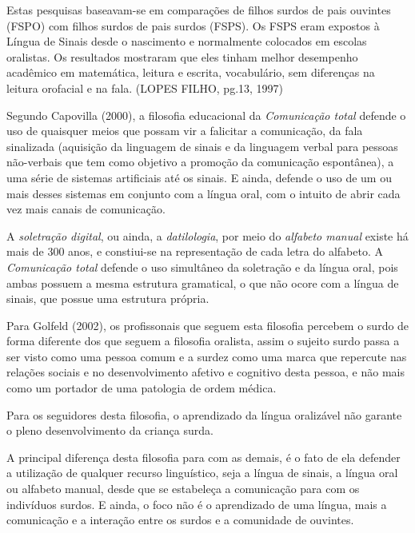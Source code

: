 \documentclass[brasil]{abnt}
\begin{document}
			\begin{citacao} Estas pesquisas baseavam-se em comparações de filhos surdos de pais ouvintes (FSPO) com filhos surdos de pais surdos (FSPS). Os FSPS eram expostos à Língua de Sinais desde o nascimento e normalmente colocados 
							em escolas oralistas. Os resultados mostraram que eles tinham melhor desempenho acadêmico em matemática, leitura e escrita, vocabulário, sem diferenças na leitura orofacial e
							na fala. (LOPES FILHO, pg.13, 1997)
			\end{citacao}
		  
		 Segundo Capovilla (2000), a filosofia educacional da \textit{Comunicação total} defende o uso de quaisquer meios que possam vir a falicitar a comunicação, da fala sinalizada (aquisição da linguagem de sinais e da linguagem verbal para pessoas 
		 não-verbais que tem como objetivo a promoção da comunicação espontânea), a uma série de sistemas artificiais até os sinais. E ainda, defende o uso de um ou mais desses sistemas em conjunto com a língua oral, com o intuito de abrir cada vez mais
		 canais de comunicação.
		 
		 A \textit{soletração digital}, ou ainda, a \textit{datilologia}, por meio do \textit{alfabeto manual} existe há mais de 300 anos, e constiui-se na representação de cada letra do alfabeto. A \textit{Comunicação total} defende o uso simultâneo 
		 da soletração e da língua oral, pois ambas possuem a mesma estrutura gramatical, o que não ocore com a língua de sinais, que possue uma estrutura própria.  
		
		 Para Golfeld (2002), os profissonais que seguem esta filosofia percebem o surdo de forma diferente dos que seguem a filosofia oralista, assim o sujeito surdo passa a ser visto como uma pessoa comum e a surdez como uma marca que repercute nas relações 
		 sociais e no desenvolvimento afetivo e cognitivo desta pessoa, e não mais como um portador de uma patologia de ordem médica.
		 
		 Para os seguidores desta filosofia, o aprendizado da língua oralizável não garante o pleno desenvolvimento da criança surda.
		 
		 A principal diferença desta filosofia para com as demais, é o fato de ela defender a utilização de qualquer recurso linguístico, seja a língua de sinais, a língua oral ou alfabeto manual, desde que se estabeleça a comunicação para com os 
		 indivíduos surdos. E ainda, o foco não é o aprendizado de uma língua, mais a comunicação e a interação entre os surdos e a comunidade de ouvintes.
		 
\end{document}

